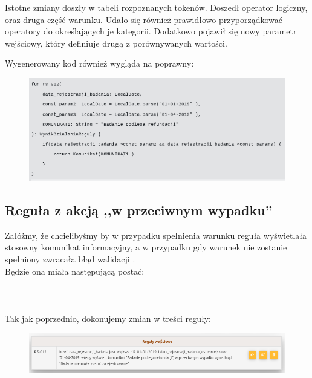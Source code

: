 Istotne zmiany doszły w tabeli rozpoznanych tokenów. Doszedł operator logiczny, oraz druga część warunku. Udało się również prawidłowo przyporządkować operatory do określających je kategorii. Dodatkowo pojawił się nowy parametr wejściowy, który definiuje drugą z porównywanych wartości. 

Wygenerowany kod również wygląda na poprawny:
\begin{figure}[H]
	\centering
	\includegraphics[scale=0.8]{img/app-eksperymenty/p2-3.png}
\end{figure}

\subsection{Reguła z akcją ,,w przeciwnym wypadku''}
Załóżmy, że chcielibyśmy by  w przypadku spełnienia warunku reguła wyświetlała stosowny komunikat informacyjny, a w przypadku gdy warunek nie zostanie spełniony zwracała błąd walidacji . \\
Będzie ona miała następującą postać:
\\ \\
\\ \\
Tak jak poprzednio, dokonujemy zmian w treści reguły:
\begin{figure}[H]
	\centering
	\includegraphics[scale=0.8]{img/app-eksperymenty/p3-1.png}
\end{figure}

